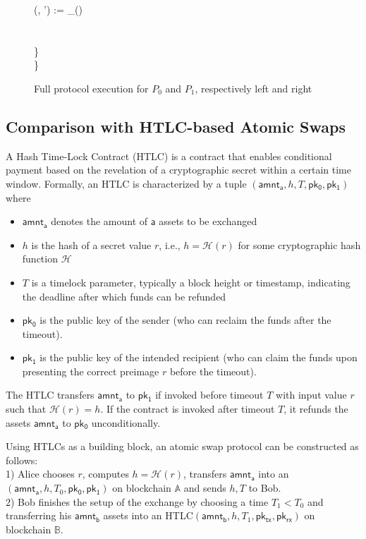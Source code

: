 \begin{figure}[H]
\begin{minipage}[t]{0.5\textwidth}
\begin{pchstack}[boxed]
{        \qquad (, ') := _() \\
        \qquad {} \:\:   \\ %
        \qquad \quad {} \perp \\
        \quad \} \\
        \} \\
    }
    \end{pchstack}
    \end{minipage}%
    \caption{Full protocol execution for $P_0$ and $P_1$, respectively left and right}
    \end{figure}

\subsection{Comparison with HTLC-based Atomic Swaps}

A Hash Time-Lock Contract (HTLC) is a contract that enables conditional payment based on the revelation of a cryptographic secret within a certain time window. Formally, an HTLC is characterized by a tuple  $(\mathsf{amnt_a}, h, T, \mathsf{pk_0}, \mathsf{pk_1})$ where
\begin{itemize}
	\item $\mathsf{amnt_a}$ denotes the amount of $\mathsf{a}$ assets to be exchanged
	\item $h$ is the hash of a secret value $r$, i.e., $h = \mathcal{H}(r)$ for some cryptographic hash function $\mathcal{H}$
	\item $T$ is a timelock parameter, typically a block height or timestamp, indicating the deadline after which funds can be refunded
	\item $\mathsf{pk_0}$ is the public key of the sender (who can reclaim the funds after the timeout).
	\item $\mathsf{pk_1}$ is the public key of the intended recipient (who can claim the funds upon presenting the correct preimage $r$ before the timeout).
\end{itemize}

The HTLC transfers $\mathsf{amnt_a}$ to $\mathsf{pk_1}$ if invoked before timeout $T$ with input value $r$ such that $\mathcal{H}(r) = h$. 
If the contract is invoked after timeout $T$, it refunds the assets $\mathsf{amnt_a}$ to $\mathsf{pk_0}$ unconditionally.

Using HTLCs as a building block, an atomic swap protocol can be constructed as follows: \\
1) Alice chooses $r$, computes $h = \mathcal{H}(r)$, transfers $\mathsf{amnt_a}$ into an $(\mathsf{amnt_a}, h, T_0, \mathsf{pk_0}, \mathsf{pk_1})$ on blockchain $\mathbb{A}$ and sends $h,T$ to Bob. \\
2) Bob finishes the setup of the exchange by choosing a time $T_1 < T_0$ and transferring his $\mathsf{amnt_b}$ assets into an HTLC$(\mathsf{amnt_b}, h, T_1, \mathsf{pk_{tx}}, \mathsf{pk_{rx}})$ on blockchain $\mathbb{B}$.

